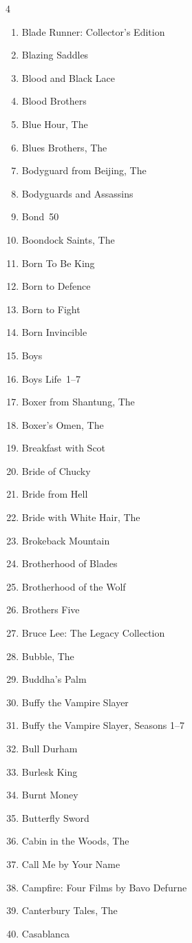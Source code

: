 \documentclass{article}
\begin{document}
\begin{multicols}{4}
\begin{enumerate}
\item Blade Runner: Collector's Edition
\item Blazing Saddles
\item Blood and Black Lace
\item Blood Brothers
\item Blue Hour, The
\item Blues Brothers, The
\item Bodyguard from Beijing, The
\item Bodyguards and Assassins
\item Bond~50
\item Boondock Saints, The
\item Born To Be King
\item Born to Defence
\item Born to Fight
\item Born Invincible
\item Boys
\item Boys Life~1--7
\item Boxer from Shantung, The
\item Boxer's Omen, The
\item Breakfast with Scot
\item Bride of Chucky
\item Bride from Hell
\item Bride with White Hair, The
\item Brokeback Mountain
\item Brotherhood of Blades
\item Brotherhood of the Wolf
\item Brothers Five
\item Bruce Lee: The Legacy Collection
\item Bubble, The
\item Buddha's Palm
\item Buffy the Vampire Slayer
\item Buffy the Vampire Slayer, Seasons 1--7
\item Bull Durham
\item Burlesk King
\item Burnt Money
\item Butterfly Sword
\item Cabin in the Woods, The
\item Call Me by Your Name
\item Campfire: Four Films by Bavo Defurne
\item Canterbury Tales, The
\item Casablanca

\end{enumerate}
\end{multicols}
\end{document}
